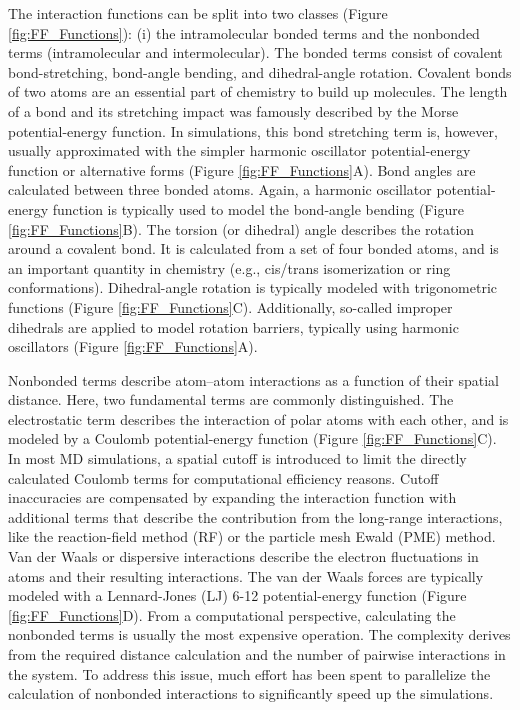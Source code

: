 The interaction functions can be split into two classes (Figure \ref{fig:FF_Functions}): (i) the intramolecular bonded terms and the nonbonded terms (intramolecular and intermolecular).\cite{Weiner1984, Riniker2018}
The bonded terms consist of covalent bond-stretching, bond-angle bending, and dihedral-angle rotation.
Covalent bonds of two atoms are an essential part of chemistry to build up molecules. \cite{Pauling1934} The length of a bond and its stretching impact was famously described by the Morse potential-energy function. \cite{Morse1929, Iozzi2009} In simulations, this bond stretching term is, however, usually approximated with the simpler harmonic oscillator potential-energy function or alternative forms (Figure \ref{fig:FF_Functions}A).\cite{Gunsteren1996} Bond angles are calculated between three bonded atoms. 
Again, a harmonic oscillator potential-energy function is typically used to model the bond-angle bending (Figure \ref{fig:FF_Functions}B). 
The torsion (or dihedral) angle describes the rotation around a covalent bond. \cite{Blondel1996} It is calculated from a set of four bonded atoms, and is an important quantity in chemistry (e.g., cis/trans isomerization \cite{Dugave2003} or ring conformations\cite{Strauss1970}). Dihedral-angle rotation is typically modeled with trigonometric functions (Figure \ref{fig:FF_Functions}C).
Additionally, so-called improper dihedrals are applied to model rotation barriers, typically using harmonic oscillators (Figure \ref{fig:FF_Functions}A).\cite{Blondel1996}

Nonbonded terms describe atom--atom interactions as a function of their spatial distance. Here, two fundamental terms are commonly distinguished.
The electrostatic term describes the interaction of polar atoms with each other, and is modeled by a Coulomb potential-energy function (Figure \ref{fig:FF_Functions}C). \cite{Gillmor2017, Atkins2014} In most MD simulations, a spatial cutoff is introduced to limit the directly calculated Coulomb terms for computational efficiency reasons. Cutoff inaccuracies are compensated by expanding the interaction function with additional terms that describe the contribution from the long-range interactions, like the reaction-field method (RF) \cite{Tironi1995} or the particle mesh Ewald (PME) \cite{Darden1993} method.
Van der Waals or dispersive interactions describe the electron fluctuations in atoms and their resulting interactions.\cite{Kawai2016, Margenau1939} The van der Waals forces \cite{Margenau1939} are typically modeled with a Lennard-Jones (LJ)\cite{Jones1924} 6-12 potential-energy function (Figure \ref{fig:FF_Functions}D).
From a computational perspective, calculating the nonbonded terms is usually the most expensive operation. The complexity derives from the required distance calculation and the number of pairwise interactions in the system. To address this issue, much effort has been spent to parallelize the calculation of nonbonded interactions to significantly speed up the simulations.\cite{Berendsen1995, Schmid2012, Eastman2010, Meel2008}


